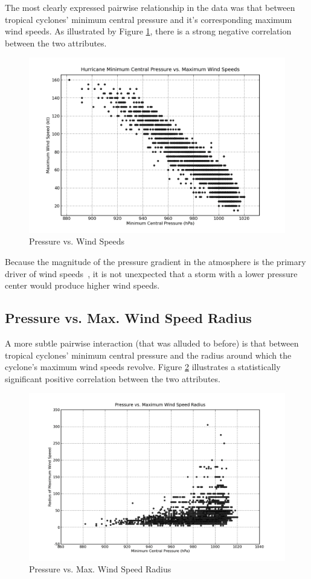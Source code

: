 \documentclass[letterpaper,twocolumn,10pt]{article}
\begin{document}
The most clearly expressed pairwise relationship in the data was that between
tropical cyclones' minimum central pressure and it's corresponding maximum wind
speeds. As illustrated by Figure \ref{pressure_vs_speed}, there is
a strong negative correlation between the two attributes.
\begin{figure}[h!]
  \centering
  \includegraphics[scale=0.31]{pressure_vs_speed.png}
  \caption{Pressure vs. Wind Speeds}
  \label{pressure_vs_speed}
\end{figure}

Because the magnitude of the pressure gradient in the atmosphere is the primary
driver of wind speeds~\cite{MeteorologyToday}, it is not unexpected that a storm
with a lower pressure center would produce higher wind speeds.


\subsection{Pressure vs. Max. Wind Speed Radius}
A more subtle pairwise interaction (that was alluded to before) is that between
tropical cyclones' minimum central pressure and the radius around which the 
cyclone's maximum wind speeds revolve. Figure \ref{pressure_vs_radius}
illustrates a statistically significant positive correlation between the two
attributes.
\begin{figure}[h!]
  \centering
  \includegraphics[scale=0.27]{pressure_vs_radius.png}
  \caption{Pressure vs. Max. Wind Speed Radius}
  \label{pressure_vs_radius}
\end{figure}
\end{document}
